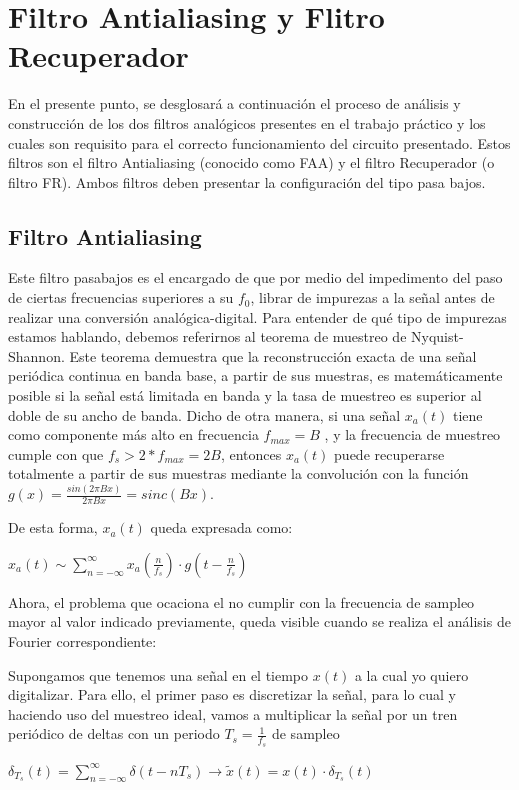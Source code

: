 \documentclass[../../ASSD_TP1_G7.tex]{subfiles}
\begin{document}
\chapter*{Filtro Antialiasing y Flitro Recuperador}
En el presente punto, se desglosará a continuación el proceso de análisis
y construcción de los dos filtros analógicos presentes en el trabajo
práctico y los cuales son requisito para el correcto funcionamiento
del circuito presentado. Estos filtros son el filtro Antialiasing
(conocido como FAA) y el filtro Recuperador (o filtro FR). Ambos filtros
deben presentar la configuración del tipo pasa bajos.


\section{Filtro Antialiasing}

Este filtro pasabajos es el encargado de que por medio del impedimento
del paso de ciertas frecuencias superiores a su $f_{0}$, librar de
impurezas a la señal antes de realizar una conversión analógica-digital.
Para entender de qué tipo de impurezas estamos hablando, debemos referirnos
al teorema de muestreo de Nyquist-Shannon. Este teorema demuestra
que la reconstrucción exacta de una señal periódica continua en banda
base, a partir de sus muestras, es matemáticamente posible si la señal
está limitada en banda y la tasa de muestreo es superior al doble
de su ancho de banda. Dicho de otra manera, si una señal $x_{a}(t)$
tiene como componente más alto en frecuencia $f_{max}=B$ , y la frecuencia
de muestreo cumple con que $f_{s}>2*f_{max}=2B$, entonces $x_{a}(t)$
puede recuperarse totalmente a partir de sus muestras mediante la
convolución con la función $g(x)=\frac{sin(2\pi Bx)}{2\pi Bx}=sinc(Bx)$.

De esta forma, $x_{a}(t)$ queda expresada como:
\begin{center}
\textit{\Large{}$x_{a}(t)\sim\sum_{n=-\infty}^{\infty}x_{a}(\frac{n}{f_{s}})\cdot g(t-\frac{n}{f_{s}})$}{\Large\par}
\par\end{center}

Ahora, el problema que ocaciona el no cumplir con la frecuencia de
sampleo mayor al valor indicado previamente, queda visible cuando
se realiza el análisis de Fourier correspondiente:

Supongamos que tenemos una señal en el tiempo $x(t)$ a la cual yo
quiero digitalizar. Para ello, el primer paso es discretizar la señal,
para lo cual y haciendo uso del muestreo ideal, vamos a multiplicar
la señal por un tren periódico de deltas con un periodo $T_{s}=\frac{1}{f_{s}}$
de sampleo
\begin{center}
\textit{\Large{}$\delta_{T_{s}}(t)=\sum_{n=-\infty}^{\infty}\delta(t-nT_{s})\rightarrow\tilde{x}(t)=x(t)\cdot\delta_{T_{s}}(t)$}{\Large\par}
\par\end{center}
\end{document}

